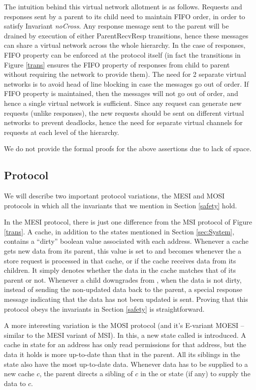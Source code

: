 The intuition behind this virtual network allotment is as follows. Requests and
responses sent by a parent to its child need to maintain FIFO order, in order
to satisfy Invariant \textit{noCross}. Any response message sent to the parent
will be drained by execution of either ParentRecvResp transitions, hence these
messages can share a virtual network across the whole hierarchy. In the case of
responses, FIFO property can be enforced at the protocol itself (in fact the
transitions in Figure \ref{trans} ensures the FIFO property of responses from
child to parent without requiring the network to provide them). The need for 2
separate virtual networks is to avoid head of line blocking in case the
messages go out of order. If FIFO property is maintained, then the messages
will not go out of order, and hence a single virtual network is sufficient.
Since any request can generate new requests (unlike responses), the new
requests should be sent on different virtual networks to prevent deadlocks,
hence the need for separate virtual channels for requests at each level of the
hierarchy.

We do not provide the formal proofs for the above assertions due to lack of space.

\subsection{Protocol}
We will describe two important protocol variations, the MESI and MOSI protocols
in which all the invariants that we mention in Section \ref{safety} hold.

In the MESI protocol, there is just one difference from the MSI protocol of
Figure \ref{trans}. A cache, in addition to the states mentioned in Section
\ref{sec:System}, contains a ``dirty'' boolean value associated with each
address.  Whenever a cache gets new data from its parent, this value is set to
\False{} and becomes \True{} whenever the a store request is processed in that
cache, or if the cache receives data from its children. It simply denotes
whether the data in the cache matches that of its parent or not.  Whenever a
child downgrades from \Mo{}, when the data is not dirty, instead of sending the
non-updated data back to the parent, a special response message indicating that
the data has not been updated is sent. Proving that this protocol obeys the
invariants in Section \ref{safety} is straightforward.

A more interesting variation is the MOSI protocol (and it's E-variant MOESI --
similar to the MESI variant of MSI). In this, a new state called \Ow{} is
introduced. A cache in \Ow{} state for an address has only read permissions for
that address, but the data it holds is more up-to-date than that in the parent.
All its siblings in the \Sh{} state also have the most up-to-date data.
Whenever data has to be supplied to a new cache $c$, the parent directs a
sibling of $c$ in the \Ow{} or \Mo{} state (if any) to supply the data to $c$.

